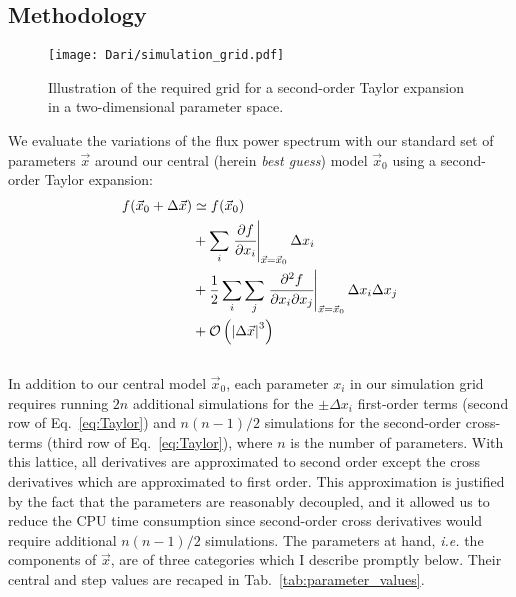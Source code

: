 \vspace*{1.5pc}


\subsection{Methodology}
\label{sec:methodology}

\begin{figure}
\centering
\texttt{[image: Dari/simulation\_grid.pdf]}
\caption{Illustration of the required grid for a second-order Taylor expansion in a
two-dimensional parameter space.}\label{fig:grid}
\end{figure}

We evaluate the variations of the flux power spectrum with our standard set of parameters $\vec{x}$
around our central (herein \emph{best guess}) model $\vec{x}_0$ using a second-order Taylor expansion:\\
\begin{align}
\label{eq:Taylor}
f(\vec{x}_0 + \Delta \vec{x}) &\simeq f(\vec{x}_0)\\
&+ \sum_i \left. \cfrac{\partial f}{\partial x_i} \right\vert_{\vec{x} = \vec{x}_0} \Delta x_i \\
&+ \frac{1}{2}  \sum_{i} \sum_{j}  \left. \cfrac{\partial^2 f}{\partial x_i \partial x_j} \right\vert_{\vec{x} = \vec{x}_0} \Delta x_i \Delta x_j \\
&+ \mathcal{O} \left( \left\vert \Delta \vec{x} \right\vert^3 \right) 
\end{align} \\

In addition to our central model $\vec{x}_0$, each parameter $x_i$ in our simulation grid requires running $2n$ additional simulations for the $\pm \Delta x_i$ first-order terms (second row of Eq.~\ref{eq:Taylor}) and $n \left( n-1 \right) / 2$ simulations for the second-order cross-terms (third row of Eq.~\ref{eq:Taylor}), where $n$ is the number of parameters. With this lattice, all derivatives are approximated  to second order except the
cross derivatives which are approximated to first order. This approximation is justified by the fact that the parameters are reasonably decoupled, and it allowed us to reduce the CPU time consumption since second-order cross derivatives would require additional $n(n-1)/2$ simulations. The parameters at hand, \textit{i.e.} the components of $\vec{x}$, are of three categories which I describe promptly below. Their central and step values are recaped in Tab.~\ref{tab:parameter_values}.

